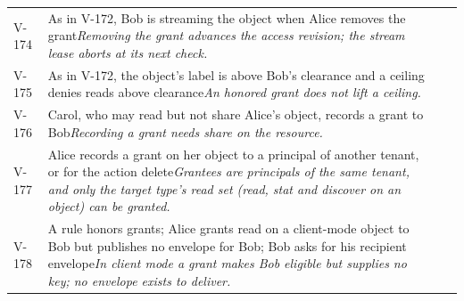 \begin{longtable}{@{}P{0.08\textwidth}P{0.40\textwidth}P{0.24\textwidth}P{0.16\textwidth}@{}}
V-174 & As in V-172, Bob is streaming the object when Alice removes the grant\newline\textit{Removing the grant advances the access revision; the stream lease aborts at its next check.} &  & \\
V-175 & As in V-172, the object's label is above Bob's clearance and a ceiling denies reads above clearance\newline\textit{An honored grant does not lift a ceiling.} &  & \\
V-176 & Carol, who may read but not share Alice's object, records a grant to Bob\newline\textit{Recording a grant needs share on the resource.} &  & \\
V-177 & Alice records a grant on her object to a principal of another tenant, or for the action delete\newline\textit{Grantees are principals of the same tenant, and only the target type's read set (read, stat and discover on an object) can be granted.} &  & \\
V-178 & A rule honors grants; Alice grants read on a client-mode object to Bob but publishes no envelope for Bob; Bob asks for his recipient envelope\newline\textit{In client mode a grant makes Bob eligible but supplies no key; no envelope exists to deliver.} &  & \\
\bottomrule
\end{longtable}
